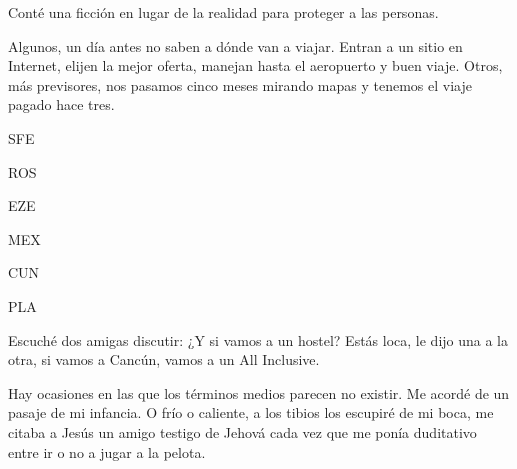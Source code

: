 \documentclass[12pt,twoside,openright,a5paper]{book}
\begin{document}
\vspace{0.5cm}
\hrulefill\hspace{0.2cm} \decofourleft\decofourright \hspace{0.2cm} \hrulefill
\vspace{0.5cm}

Conté una ficción en lugar de la realidad para proteger a las personas.


\vspace{0.5cm}
\hrulefill\hspace{0.2cm} \decofourleft\decofourright \hspace{0.2cm} \hrulefill
\vspace{0.5cm}

Algunos, un día antes no saben a dónde van a viajar. Entran a un sitio
en Internet, elijen la mejor oferta, manejan hasta el aeropuerto y buen
viaje. Otros, más previsores, nos pasamos cinco meses mirando mapas y
tenemos el viaje pagado hace tres.


\vspace{0.5cm}
\hrulefill\hspace{0.2cm} \decofourleft\decofourright \hspace{0.2cm} \hrulefill
\vspace{0.5cm}

SFE

ROS

EZE

MEX

CUN

PLA


\vspace{0.5cm}
\hrulefill\hspace{0.2cm} \decofourleft\decofourright \hspace{0.2cm} \hrulefill
\vspace{0.5cm}

Escuché dos amigas discutir: ¿Y si vamos a un hostel? Estás loca, le
dijo una a la otra, si vamos a Cancún, vamos a un All Inclusive.

Hay ocasiones en las que los términos medios parecen no existir.
Me acordé de un pasaje de mi infancia.
O frío o caliente, a los tibios los escupiré de mi boca, me citaba a Jesús un
amigo testigo de Jehová cada vez que me ponía duditativo entre ir o no
a jugar a la pelota.

\afterpage{}
\vspace{0.5cm}
\hrulefill\hspace{0.2cm} \decofourleft\decofourright \hspace{0.2cm} \hrulefill
\vspace{0.5cm}
\end{document}

